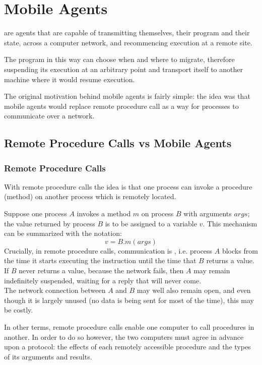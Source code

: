\chapter{Mobile Agents}
\minitoc

\phantom{c} are agents that are capable of transmitting themselves, their program and their state, across a computer network, and recommencing execution at a remote site.

The program in this way can choose when and where to migrate, therefore suspending its execution at an arbitrary point and transport itself to another machine where it would resume execution.

The original motivation behind mobile agents is fairly simple: the idea was that mobile agents would replace remote procedure call as a way for processes to communicate over a network.\\



\section{Remote Procedure Calls vs Mobile Agents}
\subsection{Remote Procedure Calls}

With remote procedure calls the idea is that one process can invoke a procedure (method) on another process which is remotely located.

Suppose one process $A$ invokes a method $m$ on process $B$ with arguments $args$; the value returned by process $B$ is to be assigned to a variable $v$. This mechanism can be summarized with the notation:
\[v = B.m(args)\]
Crucially, in remote procedure calls, communication is , i.e. process $A$ blocks from the time it starts executing the instruction until the time that $B$ returns a value. If $B$ never returns a value, because the network fails, then $A$ may remain indefinitely suspended, waiting for a reply that will never come.\\
The network connection between $A$ and $B$ may well also remain open, and even though it is largely unused (no data is being sent for most of the time), this may be costly.

In other terms, remote procedure calls enable one computer to call procedures in another. In order to do so however, the two computers must agree in advance upon a protocol: the effects of each remotely accessible procedure and the types of its arguments and results.

